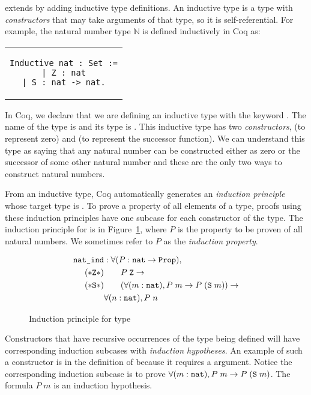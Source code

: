 \cic{} extends \coc{} by adding inductive type definitions. An inductive type is a type with \emph{constructors} that may take arguments of that type, so it is self-referential. For example, the natural number type $\mathbb{N}$ is defined inductively in Coq as:
\begin{center}
\begin{tabular}{c}
\begin{lstlisting}
Inductive nat : Set :=
| Z : nat
| S : nat -> nat.
\end{lstlisting}
\end{tabular}
\end{center}
In Coq, we declare that we are defining an inductive type with the keyword . The name of the type is  and its type is . This inductive type has two \emph{constructors},  (to represent zero) and  (to represent the successor function). We can understand this type as saying that any natural number can be constructed either as zero or the successor of some other natural number and these are the only two ways to construct natural numbers.

From an inductive type, Coq automatically generates an \emph{induction principle} whose target type is . To prove a property of all elements of a type, proofs using these induction principles have one subcase for each constructor of the type. The induction principle for  is in Figure~\ref{fig:natind}, where $P$ is the property to be proven of all natural numbers. We sometimes refer to $P$ as the \emph{induction property}.

\begin{figure}
\begin{align*}
\texttt{nat\_ind} &: \forall (P : \texttt{nat} \rightarrow \texttt{Prop}), \\
(*\texttt{Z}*) & \qquad P \; \texttt{Z} \rightarrow \\
(*\texttt{S}*) & \qquad (\forall (m : \texttt{nat}), P \; m \rightarrow P \; (\texttt{S} \; m)) \rightarrow \\
& \forall (n : \texttt{nat}), P \; n
\end{align*}
\caption{Induction principle for type  \label{fig:natind}}
\end{figure}

Constructors that have recursive occurrences of the type being defined will have corresponding induction subcases with \emph{induction hypotheses}. An example of such a constructor is  in the definition of  because it requires a  argument. Notice the corresponding induction subcase is to prove $\forall (m : \texttt{nat}), P \; m \rightarrow P \; (\texttt{S} \; m)$. The formula $P \; m$ is an induction hypothesis.

